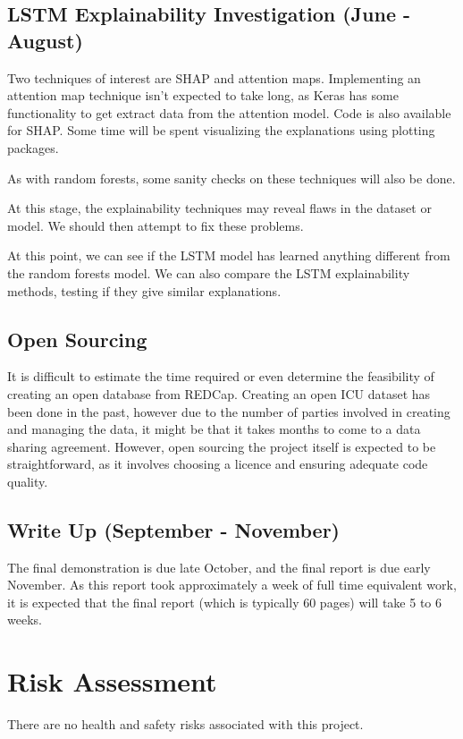 \documentclass[12pt]{article}
\begin{document}
\subsection{LSTM Explainability Investigation  (June - August)}

Two techniques of interest are SHAP and attention maps. Implementing an attention map technique isn't expected to take long, as Keras has some functionality to get extract data from the attention model. Code is also available for SHAP. Some time will be spent visualizing the explanations using plotting packages.

As with random forests, some sanity checks on these techniques will also be done. 

At this stage, the explainability techniques may reveal flaws in the dataset or model. We should then attempt to fix these problems.

At this point, we can see if the LSTM model has learned anything different from the random forests model. We can also compare the LSTM explainability methods, testing if they give similar explanations.

\subsection{Open Sourcing}
It is difficult to estimate the time required or even determine the feasibility of creating an open database from REDCap. Creating an open ICU dataset has been done in the past, however due to the number of parties involved in creating and managing the data, it might be that it takes months to come to a data sharing agreement. However, open sourcing the project itself is  expected to be straightforward, as it involves choosing a licence and ensuring adequate code quality.

\subsection{Write Up (September - November)}

The final demonstration is due late October, and the final report is due early November.  As this report took approximately a week of full time equivalent work, it is expected that the final report (which is typically 60 pages) will take 5 to 6 weeks.

\section{Risk Assessment}
There are no health and safety risks associated with this project.
\end{document}
